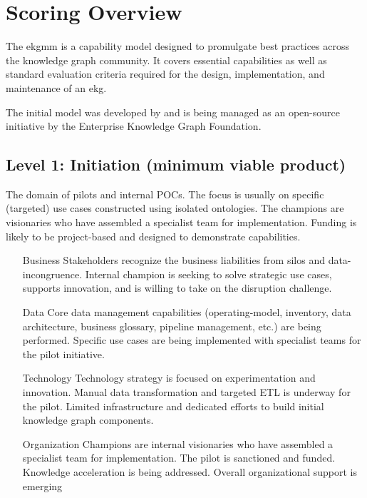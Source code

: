 \section{Scoring Overview}\label{sec:ekg-mm-scoring-overview}

The \gls{ekgmm} is a capability model designed to promulgate best practices across the knowledge graph community.
It covers essential capabilities as well as standard evaluation criteria required for the design, implementation,
and maintenance of an \gls{ekg}.

The initial model was developed by \agnos and is being managed as an open-source initiative by the
Enterprise Knowledge Graph Foundation.

\subsection{Level 1:  Initiation (minimum viable product)}

The domain of pilots and internal POCs.
The focus is usually on specific (targeted) use cases constructed using isolated ontologies.
The champions are visionaries who have assembled a specialist team for implementation.
Funding is likely to be project-based and designed to demonstrate capabilities.

\begin{itemize}[leftmargin=1in,font=\bfseries]

    \item[Business]     Stakeholders recognize the business liabilities from silos and \gls{data-incongruence}.
                        Internal champion is seeking to solve strategic use cases, supports innovation, and is willing
                        to take on the disruption challenge.
    \item[Data]         Core data management capabilities (\gls{operating-model}, inventory, data architecture, business
                        glossary, pipeline management, etc.) are being performed.
                        Specific use cases are being implemented with specialist teams for the pilot initiative.
    \item[Technology]   Technology strategy is focused on experimentation and innovation.
                        Manual data transformation and targeted ETL is underway for the pilot.
                        Limited infrastructure and dedicated efforts to build initial knowledge graph components.
    \item[Organization] Champions are internal visionaries who have assembled a specialist team for implementation.
                        The pilot is sanctioned and funded.
                        Knowledge acceleration is being addressed.
                        Overall organizational support is emerging

\end{itemize}

